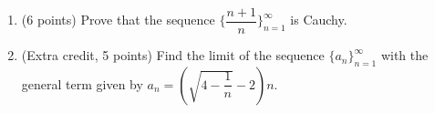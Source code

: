 \documentclass[fleqn]{article}
\begin{document}
\begin{enumerate}


    \item (6 points) Prove that the sequence $\{\dfrac{n+1}{n}\}_{n=1}^{\infty}$ is Cauchy.




    \item (Extra credit, 5 points) Find the limit of the sequence $\{a_n\}_{n=1}^{\infty}$ with the general term given by 
    $a_n=\left(\sqrt{4-\dfrac{1}{n}}-2\right)n$.



  \end{enumerate}
\end{document}
